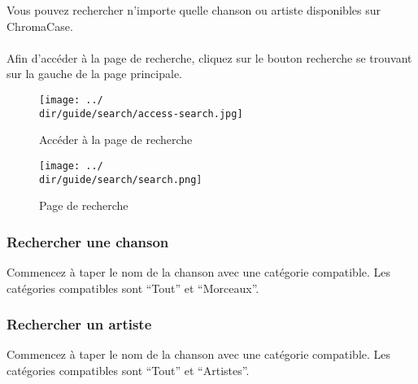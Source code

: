 Vous pouvez rechercher n'importe quelle chanson ou artiste disponibles sur ChromaCase.
\\\\
Afin d’accéder à la page de recherche, cliquez sur le bouton recherche se trouvant sur la gauche de la page principale.

\begin{figure}[H]
	\texttt{[image: ../\\dir/guide/search/access-search.jpg]}
	\caption{Accéder à la page de recherche}
\end{figure}
\begin{figure}[H]
	\texttt{[image: ../\\dir/guide/search/search.png]}
	\caption{Page de recherche}
\end{figure}

\subsubsection{Rechercher une chanson}
Commencez à taper le nom de la chanson avec une catégorie compatible. Les catégories compatibles sont “Tout” et “Morceaux”.

\subsubsection{Rechercher un artiste}
Commencez à taper le nom de la chanson avec une catégorie compatible. Les catégories compatibles sont “Tout” et “Artistes”.